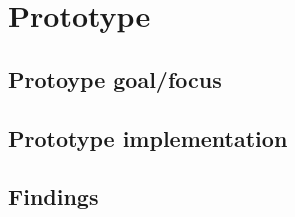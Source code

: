 \chapter{Prototype} %

\label{Chapter5} %


\section{Protoype goal/focus}

\section{Prototype implementation}

\section{Findings}